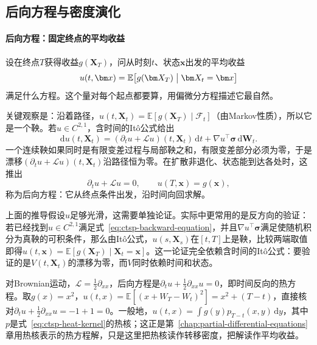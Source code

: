 \subsection{后向方程与密度演化}
\label{sec:ctsp-backward-forward}

\paragraph{后向方程：固定终点的平均收益}
设在终点$T$获得收益$g(\bm X_T)$，问从时刻$t$、状态$\bm x$出发的平均收益
\begin{equation}
  u(t,\bm x)=\mathbb E\bigl[g(\bm X_T)\bigm|\bm X_t=\bm x\bigr]
  \label{eq:ctsp-backward-value}
\end{equation}
满足什么方程。这个量对每个起点都要算，用偏微分方程描述它最自然。

关键观察是：沿着路径，$u(t,\bm X_t)=\mathbb E[g(\bm X_T)\mid\mathcal F_t]$（由Markov性质），所以它是一个鞅。若$u\in C^{2,1}$，含时间的Itô公式给出
\[
  \mathrm du(t,\bm X_t)=(\partial_t u+\mathcal Lu)(t,\bm X_t)\,\mathrm dt+\nabla u^\top\bm\sigma\,\mathrm d\bm W_t .
\]
一个连续鞅如果同时是有限变差过程与局部鞅之和，有限变差部分必须为零，于是漂移$(\partial_tu+\mathcal Lu)(t,\bm X_t)$沿路径恒为零。在扩散非退化、状态能到达各处时，这推出
\begin{equation}
  \partial_tu+\mathcal Lu=0,\qquad u(T,\bm x)=g(\bm x),
  \label{eq:ctsp-backward-equation}
\end{equation}
称为后向方程：它从终点条件出发，沿时间向回求解。

上面的推导假设$u$足够光滑，这需要单独论证。实际中更常用的是反方向的验证：若已经找到$u\in C^{2,1}$满足式~\eqref{eq:ctsp-backward-equation}，并且$\nabla u^\top\bm\sigma$满足使随机积分为真鞅的可积条件，那么由Itô公式，$u(s,\bm X_s)$在$[t,T]$上是鞅，比较两端取值即得$u(t,\bm x)=\mathbb E[g(\bm X_T)\mid\bm X_t=\bm x]$。这一论证完全依赖含时间的Itô公式：要验证的是$V(t,\bm X_t)$的漂移为零，而$V$同时依赖时间和状态。

\begin{example}[Brownian运动与热方程]
  \label{ex:ctsp-heat-equation}
  对Brownian运动，$\mathcal L=\frac12\partial_{xx}$，后向方程是$\partial_tu+\frac12\partial_{xx}u=0$，即时间反向的热方程。取$g(x)=x^2$，$u(t,x)=\mathbb E[(x+W_T-W_t)^2]=x^2+(T-t)$，直接核对$\partial_tu+\frac12\partial_{xx}u=-1+1=0$。一般地，$u(t,x)=\int g(y)p_{T-t}(x,y)\,\mathrm dy$，其中$p$是式~\eqref{eq:ctsp-heat-kernel}的热核；这正是第~\ref{chap:partial-differential-equations}章用热核表示的热方程解，只是这里把热核读作转移密度，把解读作平均收益。
\end{example}


